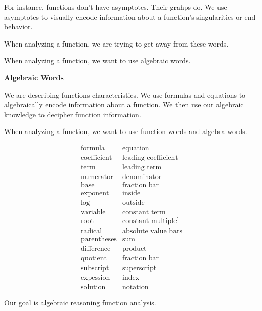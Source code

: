 \documentclass{ximera}
\begin{document}
For instance, functions don't have asymptotes. Their grahps do.  We use asymptotes to visually encode information about a function's singularities or end-behavior.


When analyzing a function, we are trying to get away from these words.



When analyzing a function, we want to use algebraic words.












\textbf{\textcolor{red!75!green}{Algebraic Words}}

We are describing functions characteristics. We use formulas and equations to algebraically encode information about a function. We then use our algebraic knowledge to decipher function information.


When analyzing a function, we want to use function words and algebra words.


\[
\begin{array}{ll}
\text{formula}  & \text{equation}  \\
\text{coefficient}  & \text{leading coefficient} \\
\text{term}    &  \text{leading term} \\
\text{numerator}  & \text{denominator} \\
\text{base}   & \text{fraction bar} \\
\text{exponent} & \text{inside} \\
\text{log} & \text{outside} \\
\text{variable} & \text{constant term} \\
\text{root} &  \text{constant multiple]} \\ 
\text{radical} &  \text{absolute value bars} \\
\text{parentheses} &  \text{sum}  \\
\text{difference} &  \text{product}  \\
\text{quotient} &  \text{fraction bar} \\
\text{subscript} &  \text{superscript} \\
\text{expession} &  \text{index} \\
\text{solution} &  \text{notation} 
\end{array}
\]



Our goal is algebraic reasoning function analysis.
\end{document}
